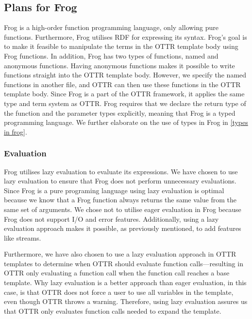 \subsection{Plans for Frog}
Frog is a high-order function programming language, only allowing pure functions. Furthermore, Frog utilises RDF for expressing its syntax. Frog's goal is to make it feasible to manipulate the terms in the OTTR template body using Frog functions. In addition, Frog has two types of functions, named and anonymous functions. Having anonymous functions makes it possible to write functions straight into the OTTR template body. However, we specify the named functions in another file, and OTTR can then use these functions in the OTTR template body. Since Frog is a part of the OTTR framework, it applies the same type and term system as OTTR. Frog requires that we declare the return type of the function and the parameter types explicitly, meaning that Frog is a typed programming language. We further elaborate on the use of types in Frog in \autoref{types in frog}.


\subsubsection{Evaluation}
\label{frog_evaluation}
Frog utilises lazy evaluation to evaluate its expressions. We have chosen to use lazy evaluation to ensure that Frog does not perform unnecessary evaluations. Since Frog is a pure programing language using lazy evaluation is optimal because we know that a Frog function always returns the same value from the same set of arguments. We chose not to utilise eager evaluation in Frog because Frog does not support I/O and error features. Additionally, using a lazy evaluation approach makes it possible, as previously mentioned, to add features like streams.

\para
Furthermore, we have also chosen to use a lazy evaluation approach in OTTR templates to determine when OTTR should evaluate function calls—resulting in OTTR only evaluating a function call when the function call reaches a base template. Why lazy evaluation is a better approach than eager evaluation, in this case, is that OTTR does not force a user to use all variables in the template, even though OTTR throws a warning. Therefore, using lazy evaluation assures us that OTTR only evaluates function calls needed to expand the template.  

